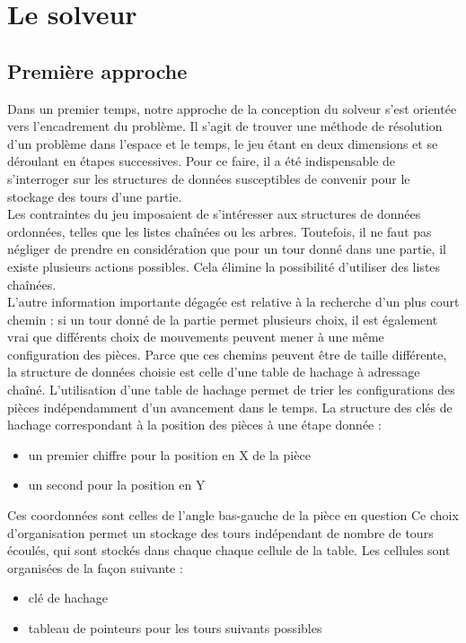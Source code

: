 \documentclass{report}
\begin{document}
\chapter{Le solveur}
\setcounter{section}{0}
\section{Première approche}
Dans un premier temps, notre approche de la conception du solveur s'est orientée vers l'encadrement du problème.
Il s'agit de trouver une méthode de résolution d'un problème dans l'espace et le temps, le jeu étant en deux dimensions et se déroulant en étapes successives.
Pour ce faire, il a été indispensable de s'interroger sur les structures de données susceptibles de convenir pour le stockage des tours d'une partie.\\
Les contraintes du jeu imposaient de s'intéresser aux structures de données ordonnées, telles que les listes chaînées ou les arbres.
Toutefois, il ne faut pas négliger de prendre en considération que pour un tour donné dans une partie, il existe plusieurs actions possibles.
Cela élimine la possibilité d'utiliser des listes chaînées.\\
L'autre information importante dégagée est relative à la recherche d'un plus court chemin : si un tour donné de la partie permet plusieurs choix, il est également vrai que différents choix de mouvements peuvent mener à une même configuration des pièces.
Parce que ces chemins peuvent être de taille différente, la structure de données choisie est celle d'une table de hachage à adressage chaîné.
L'utilisation d'une table de hachage permet de trier les configurations des pièces indépendamment d'un avancement dans le temps.
La structure des clés de hachage correspondant à la position des pièces à une étape donnée :
\begin{itemize}
\item un premier chiffre pour la position en X de la pièce 
\item un second pour la position en Y 
\end{itemize}
Ces coordonnées sont celles de l'angle bas-gauche de la pièce en question
Ce choix d'organisation permet un stockage des tours indépendant de nombre de tours écoulés, qui sont stockés dans chaque chaque cellule de la table.
Les cellules sont organisées de la façon suivante :
\begin{itemize}
\item clé de hachage
\item tableau de pointeurs pour les tours suivants possibles
\end{itemize}
\end{document}
